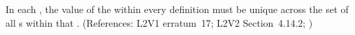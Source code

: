 In each \Event, the value of the  
within every \EventAssignment definition must be unique across the set of
all \EventAssignment{}s within that \Event.     (References: L2V1 erratum~17; L2V2 Section~4.14.2;
)
